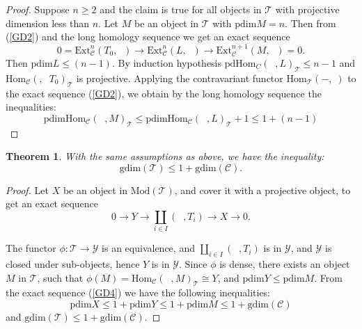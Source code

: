 \documentclass{amsart}
\newtheorem{theorem}{Theorem}
\theoremstyle{plain}
\numberwithin{equation}{section}
\begin{document}
\begin{proof}
Suppose $n\geq 2$ and the claim is true for all objects in $\mathscr{T}$
with projective dimension less than $n$. Let $M$ be an object in $\mathscr{T}
$ with $\mathrm{pdim}M=n$. Then from (\ref{GD2}) and the long homology
sequence we get an exact sequence
\begin{equation*}
0=\mathrm{Ext}_{\mathcal{C}}^{n}(T_{0},\;\;)\rightarrow \mathrm{Ext}_{\mathcal{C}}^{n}(L,\;\;)\rightarrow \mathrm{Ext}_{\mathcal{C}}^{n+1}(M,\;\;)=0\text{.}
\end{equation*}Then $\mathrm{pdim}L\leq (n-1)$. By induction hypothesis $\mathrm{pd}\mathrm{Hom}_{C}(\;\;,L)_{\mathcal{T}}\leq n-1$ and $\mathrm{Hom}_{\mathcal{C}}(,\;\;T_{0})_{\mathcal{T}}$ is projective. Applying the contravariant
functor $\mathrm{Hom}_{\mathcal{T}}(-,\;)$ to the exact sequence (\ref{GD2}), we obtain by the long homology sequence the inequalities:
\begin{equation*}
\mathrm{pdim}\mathrm{Hom}_{\mathcal{C}}(\;\;,M)_{\mathcal{T}}\leq \mathrm{pdim}\mathrm{Hom}_{\mathcal{C}}(\;\;,L)_{\mathcal{T}}+1\leq 1+(n-1)
\end{equation*}
\end{proof}

\begin{theorem}
With the same assumptions as above, we have the inequality:
\begin{equation*}
\mathrm{gdim}(\mathcal{T})\leq 1+\mathrm{gdim}(\mathcal{C}).
\end{equation*}
\end{theorem}

\begin{proof}
Let $X$ be an object in $\mathrm{\mathrm{Mod}}(\mathcal{T})$, and cover it
with a projective object, to get an exact sequence
\begin{equation}  \label{GD4}
0\rightarrow Y\rightarrow \coprod_{i\in I}(\;\;,T_{i})\rightarrow
X\rightarrow 0\text{.}
\end{equation}

The functor $\phi :\mathscr{T}\rightarrow \mathscr{Y}$ is an equivalence,
and $\coprod_{i\in I}(\;\;,T_{i})$ is in $\mathscr{Y}$, and $\mathscr{Y}$ is
closed under sub-objects, hence $Y$ is in $\mathscr{Y}$. Since $\phi $ is
dense, there exists an object $M$ in $\mathscr{T}$, such that $\phi (M)=\mathrm{Hom}_{\mathcal{C}}(\;\;,M)_{\mathcal{T}}\cong Y$, and $\mathrm{pdim}Y\leq \mathrm{pdim}M$. From the exact sequence (\ref{GD4}) we have the
following inequalities:
\begin{equation*}
\mathrm{pdim}X\leq 1+\mathrm{pdim}Y\leq 1+\mathrm{pdim}M\leq 1+\mathrm{gdim}(\mathcal{C})
\end{equation*}and $\mathrm{gdim}(\mathcal{T})\leq 1+\mathrm{gdim}(\mathcal{C})$.
\end{proof}
\end{document}
